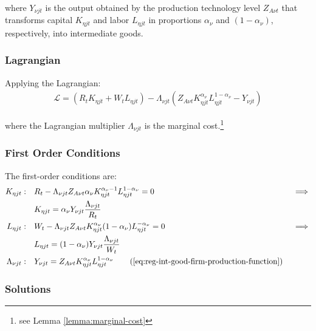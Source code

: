 \documentclass[
	thesis.tex
	]{subfiles}
\begin{document}
where $Y_{\nu jt}$ is the output obtained by the production technology level $Z_{A\nu t}$\footnotemark{} that transforms capital $K_{\eta jt}$ and labor $L_{\eta jt}$ in proportions ${\alpha_\nu}$ and $(1-{\alpha_\nu})$, respectively, into intermediate goods.


\subsubsection*{Lagrangian}

Applying the Lagrangian:
\begin{align}
	\label{eq:reg-int-good-firm-lagrangian}
	\mathcal{L} = (R_t K_{\eta jt} + W_t L_{\eta jt}) - \Lambda_{\nu jt} (Z_{A\nu t} K_{\eta jt}^{\alpha_\nu} L_{\eta jt}^{1-{\alpha_\nu}} - Y_{\nu jt})
\end{align}

where the Lagrangian multiplier $\Lambda_{\nu jt}$ is the marginal cost.\footnote{see Lemma \ref{lemma:marginal-cost}}

\subsubsection*{First Order Conditions}

The first-order conditions are:
\begin{alignat}{2}
	K_{\eta jt}: \quad & R_t - \Lambda_{\nu jt} Z_{A\nu t} {\alpha_\nu} K_{\eta jt}^{{\alpha_\nu}-1} L_{\eta jt}^{1-{\alpha_\nu}} = 0 &&\implies \nonumber \\
	& K_{\eta jt} = {\alpha_\nu} Y_{\nu jt} \frac{\Lambda_{\nu jt}}{R_t} \label{eq:reg-int-good-firm-FOC-Kt} \\
	L_{\eta jt}: \quad & W_t - \Lambda_{\nu jt} Z_{A\nu t} K_{\eta jt}^{\alpha_\nu} (1-{\alpha_\nu}) L_{\eta jt}^{-{\alpha_\nu}} = 0 \quad &&\implies \nonumber \\ 
	& L_{\eta jt} = (1-{\alpha_\nu}) Y_{\nu jt} \frac{\Lambda_{\nu jt}}{W_t} \label{eq:reg-int-good-firm-FOC-Lt} \\
	\Lambda_{\nu jt}: \quad & Y_{\nu jt} = Z_{A\nu t} K_{\eta jt}^{\alpha_\nu} L_{\eta jt}^{1-{\alpha_\nu}} \tag{\ref{eq:reg-int-good-firm-production-function}}
\end{alignat}

\subsubsection*{Solutions}
\end{document}
